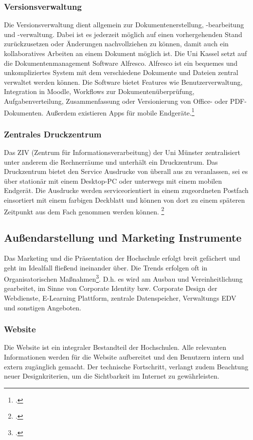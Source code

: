 \subsubsection{Versionsverwaltung}
Die Versionsverwaltung dient allgemein zur Dokumentenerstellung, -bearbeitung und -verwaltung. Dabei ist 
es jederzeit möglich auf einen vorhergehenden Stand zurückzusetzen oder Änderungen nachvollziehen zu 
können, damit auch ein kollaboratives Arbeiten an einem Dokument möglich ist. Die Uni Kassel setzt auf die 
Dokumentenmanagement Software Alfresco. Alfresco ist ein bequemes und unkompliziertes System mit dem 
verschiedene Dokumente und Dateien zentral verwaltet werden können. Die Software bietet Features wie 
Benutzerverwaltung, Integration in Moodle, Workflows zur Dokumentenüberprüfung, Aufgabenverteilung, 
Zusammenfassung oder Versionierung von Office- oder PDF-Dokumenten. Außerdem existieren Apps für 
mobile Endgeräte.\footcite{unikassel_dms_2015}


\subsubsection{Zentrales Druckzentrum}
Das ZIV (Zentrum für Informationsverarbeitung) der Uni Münster zentralisiert unter anderem die Rechnerräume und unterhält ein Druckzentrum. Das Druckzentrum bietet den Service Ausdrucke von überall aus zu veranlassen, sei es über stationär mit einem Desktop-PC oder unterwegs mit einem mobilen Endgerät. Die Ausdrucke werden serviceorientiert in einem zugeordneten Postfach einsortiert mit einem farbigen Deckblatt und können von dort zu einem späteren Zeitpunkt aus dem Fach genommen werden können.
\footcite{wwu_printnpay_2014}



\subsection{Außendarstellung und Marketing Instrumente}
\label{aussendarstellung_und_marketing_instrumente}
Das Marketing und die Präsentation der Hochschule erfolgt breit gefächert und geht im Idealfall fließend ineinander über. Die Trends erfolgen oft in Organisatorischen Maßnahmen\footcite[Vgl.][4f.]{bode_2008}. D.h. es wird am Ausbau und Vereinheitlichung gearbeitet, im Sinne von Corporate Identity bzw. Corporate Design der Webdienste, E-Learning Plattform, zentrale Datenspeicher, Verwaltungs EDV und sonstigen Angeboten.

\subsubsection{Website}
Die Website ist ein integraler Bestandteil der Hochschulen. Alle relevanten Informationen werden für die Website aufbereitet und den Benutzern intern und extern zugänglich gemacht. Der technische Fortschritt, verlangt zudem Beachtung neuer Designkriterien, um die Sichtbarkeit im Internet zu gewährleisten.

